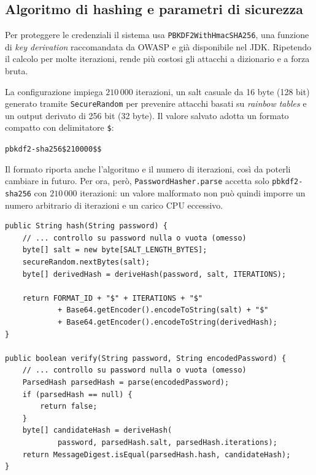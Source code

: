 \subsection{Algoritmo di hashing e parametri di sicurezza}
\label{sec:parametri-hashing}

Per proteggere le credenziali il sistema usa \texttt{PBKDF2WithHmacSHA256}, una funzione di \textit{key derivation} raccomandata da OWASP e già disponibile nel JDK. Ripetendo il calcolo per molte iterazioni, rende più costosi gli attacchi a dizionario e a forza bruta.

La configurazione impiega $210\,000$ iterazioni, un salt casuale da 16 byte (128 bit) generato tramite \texttt{SecureRandom} per prevenire attacchi basati su \textit{rainbow tables} e un output derivato di 256 bit (32 byte). Il valore salvato adotta un formato compatto con delimitatore \texttt{\$}:
\begin{center}
\texttt{pbkdf2-sha256\$210000\$<salt-base64>\$<hash-base64>}
\end{center}

Il formato riporta anche l'algoritmo e il numero di iterazioni, così da poterli cambiare in futuro. Per ora, però, \texttt{PasswordHasher.parse} accetta solo \texttt{pbkdf2-sha256} con $210\,000$ iterazioni: un valore malformato non può quindi imporre un numero arbitrario di iterazioni e un carico CPU eccessivo.

\begin{lstlisting}[caption={Derivazione dell'hash crittografico e verifica a tempo costante.}, label={lst:password-hasher}]
public String hash(String password) {
    // ... controllo su password nulla o vuota (omesso)
    byte[] salt = new byte[SALT_LENGTH_BYTES];
    secureRandom.nextBytes(salt);
    byte[] derivedHash = deriveHash(password, salt, ITERATIONS);

    return FORMAT_ID + "$" + ITERATIONS + "$" 
            + Base64.getEncoder().encodeToString(salt) + "$" 
            + Base64.getEncoder().encodeToString(derivedHash);
}

public boolean verify(String password, String encodedPassword) {
    // ... controllo su password nulla o vuota (omesso)
    ParsedHash parsedHash = parse(encodedPassword);
    if (parsedHash == null) {
        return false;
    }
    byte[] candidateHash = deriveHash(
            password, parsedHash.salt, parsedHash.iterations);
    return MessageDigest.isEqual(parsedHash.hash, candidateHash);
}
\end{lstlisting}

